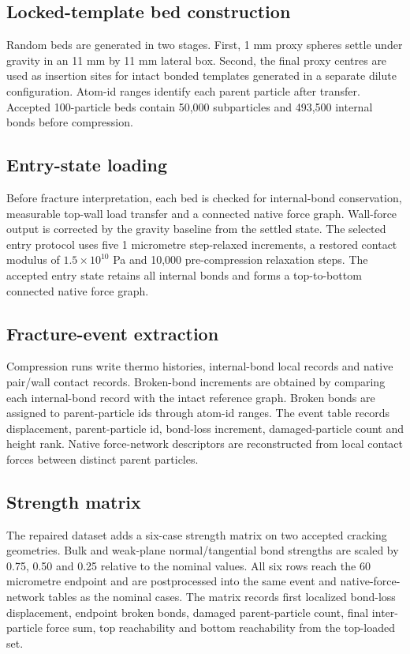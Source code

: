 \documentclass[preprint,12pt]{elsarticle}
\begin{document}
\subsection{Locked-template bed construction}

Random beds are generated in two stages. First, 1 mm proxy spheres settle under gravity in an 11 mm by 11 mm lateral box. Second, the final proxy centres are used as insertion sites for intact bonded templates generated in a separate dilute configuration. Atom-id ranges identify each parent particle after transfer. Accepted 100-particle beds contain 50,000 subparticles and 493,500 internal bonds before compression.


\subsection{Entry-state loading}

Before fracture interpretation, each bed is checked for internal-bond conservation, measurable top-wall load transfer and a connected native force graph. Wall-force output is corrected by the gravity baseline from the settled state. The selected entry protocol uses five 1 micrometre step-relaxed increments, a restored contact modulus of $1.5\times10^{10}$ Pa and 10,000 pre-compression relaxation steps. The accepted entry state retains all internal bonds and forms a top-to-bottom connected native force graph.


\subsection{Fracture-event extraction}

Compression runs write thermo histories, internal-bond local records and native pair/wall contact records. Broken-bond increments are obtained by comparing each internal-bond record with the intact reference graph. Broken bonds are assigned to parent-particle ids through atom-id ranges. The event table records displacement, parent-particle id, bond-loss increment, damaged-particle count and height rank. Native force-network descriptors are reconstructed from local contact forces between distinct parent particles.


\subsection{Strength matrix}

The repaired dataset adds a six-case strength matrix on two accepted cracking geometries. Bulk and weak-plane normal/tangential bond strengths are scaled by 0.75, 0.50 and 0.25 relative to the nominal values. All six rows reach the 60 micrometre endpoint and are postprocessed into the same event and native-force-network tables as the nominal cases. The matrix records first localized bond-loss displacement, endpoint broken bonds, damaged parent-particle count, final inter-particle force sum, top reachability and bottom reachability from the top-loaded set.
\end{document}
